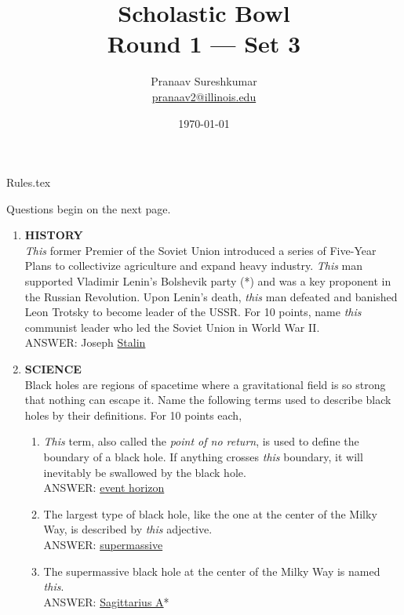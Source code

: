 \documentclass{report}
\title{\textbf{Scholastic Bowl} \\ Round 1 --- Set 3}
\author{Pranaav Sureshkumar \\ \href{mailto:pranaav2@illinois.edu}{pranaav2@illinois.edu}}
\date{\today}
\newcommand*{\backtrack}{\setcounter{enumi}{\numexpr\theenumi-1\relax}}
\begin{document}


\maketitle

{Rules.tex}

\newpage

\vspace*{\fill}
\centering
\thispagestyle{empty}
\Large
Questions begin on the next page.
\vspace*{\fill}

\normalsize
\newpage
\setcounter{page}{1}

\begin{enumerate}
    \item \textbf{HISTORY} \\ \textit{This} former Premier of the Soviet Union introduced a series of Five-Year Plans to collectivize agriculture and expand heavy industry. \textit{This} man supported Vladimir Lenin's Bolshevik party (*) and was a key proponent in the Russian Revolution. Upon Lenin's death, \textit{this} man defeated and banished Leon Trotsky to become leader of the USSR. For 10 points, name \textit{this} communist leader who led the Soviet Union in World War II. \\ ANSWER: Joseph \underline{Stalin} \backtrack
    \item \textbf{SCIENCE} \\ Black holes are regions of spacetime where a gravitational field is so strong that nothing can escape it. Name the following terms used to describe black holes by their definitions. For 10 points each,
    \begin{enumerate}[label=\Alph*]
        \item \textit{This} term, also called the \textit{point of no return}, is used to define the boundary of a black hole. If anything crosses \textit{this} boundary, it will inevitably be swallowed by the black hole. \\ ANSWER: \underline{event horizon}
        \item The largest type of black hole, like the one at the center of the Milky Way, is described by \textit{this} adjective. \\ ANSWER: \underline{supermassive}
        \item  The supermassive black hole at the center of the Milky Way is named \textit{this}. \\ ANSWER: \underline{Sagittarius A}*
    \end{enumerate}


\end{enumerate}
\end{document}
